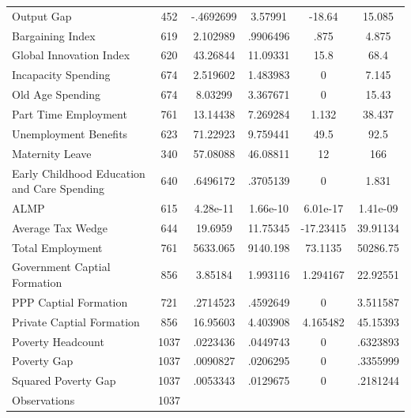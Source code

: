 \begin{table}[htbp]
\begin{tabular}{l*{1}{ccccc}}
Output Gap          &         452&   -.4692699&     3.57991&      -18.64&      15.085\\
Bargaining Index    &         619&    2.102989&    .9906496&        .875&       4.875\\
Global Innovation Index&         620&    43.26844&    11.09331&        15.8&        68.4\\
Incapacity Spending &         674&    2.519602&    1.483983&           0&       7.145\\
Old Age Spending    &         674&     8.03299&    3.367671&           0&       15.43\\
Part Time Employment&         761&    13.14438&    7.269284&       1.132&      38.437\\
Unemployment Benefits&         623&    71.22923&    9.759441&        49.5&        92.5\\
Maternity Leave     &         340&    57.08088&    46.08811&          12&         166\\
Early Childhood Education and Care Spending&         640&    .6496172&    .3705139&           0&       1.831\\
ALMP                &         615&    4.28e-11&    1.66e-10&    6.01e-17&    1.41e-09\\
Average Tax Wedge   &         644&     19.6959&    11.75345&   -17.23415&    39.91134\\
Total Employment    &         761&    5633.065&    9140.198&     73.1135&    50286.75\\
Government Captial Formation&         856&     3.85184&    1.993116&    1.294167&    22.92551\\
PPP Captial Formation&         721&    .2714523&    .4592649&           0&    3.511587\\
Private Captial Formation&         856&    16.95603&    4.403908&    4.165482&    45.15393\\
Poverty Headcount   &        1037&    .0223436&    .0449743&           0&    .6323893\\
Poverty Gap         &        1037&    .0090827&    .0206295&           0&    .3355999\\
Squared Poverty Gap &        1037&    .0053343&    .0129675&           0&    .2181244\\
\hline
Observations        &        1037&            &            &            &            \\
\hline\hline
\end{tabular}
\end{table}

